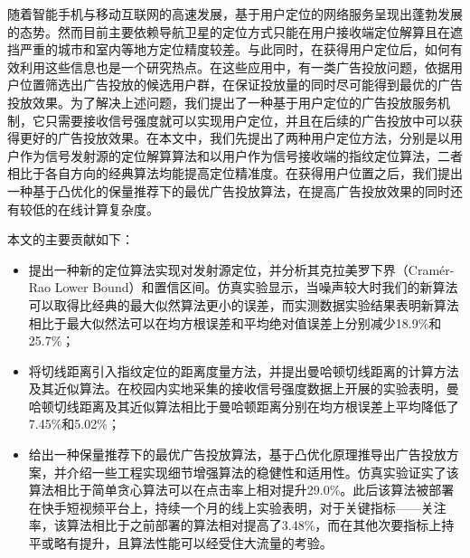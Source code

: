 \begin{cabstract}
  随着智能手机与移动互联网的高速发展，基于用户定位的网络服务呈现出蓬勃发展的态势。然而目前主要依赖导航卫星的定位方式只能在用户接收端定位解算且在遮挡严重的城市和室内等地方定位精度较差。与此同时，在获得用户定位后，如何有效利用这些信息也是一个研究热点。在这些应用中，有一类广告投放问题，依据用户位置筛选出广告投放的候选用户群，在保证投放量的同时尽可能得到最优的广告投放效果。为了解决上述问题，我们提出了一种基于用户定位的广告投放服务机制，它只需要接收信号强度就可以实现用户定位，并且在后续的广告投放中可以获得更好的广告投放效果。在本文中，我们先提出了两种用户定位方法，分别是以用户作为信号发射源的定位解算算法和以用户作为信号接收端的指纹定位算法，二者相比于各自方向的经典算法均能提高定位精准度。在获得用户位置之后，我们提出一种基于凸优化的保量推荐下的最优广告投放算法，在提高广告投放效果的同时还有较低的在线计算复杂度。

  本文的主要贡献如下：
  \begin{itemize}
    \item 提出一种新的定位算法实现对发射源定位，并分析其克拉美罗下界（Cram\'{e}r-Rao Lower Bound）和置信区间。仿真实验显示，当噪声较大时我们的新算法可以取得比经典的最大似然算法更小的误差，而实测数据实验结果表明新算法相比于最大似然法可以在均方根误差和平均绝对值误差上分别减少18.9\%和25.7\%；
    \item 将切线距离引入指纹定位的距离度量方法，并提出曼哈顿切线距离的计算方法及其近似算法。在校园内实地采集的接收信号强度数据上开展的实验表明，曼哈顿切线距离及其近似算法相比于曼哈顿距离分别在均方根误差上平均降低了7.45\%和5.02\%；
    \item 给出一种保量推荐下的最优广告投放算法，基于凸优化原理推导出广告投放方案，并介绍一些工程实现细节增强算法的稳健性和适用性。仿真实验证实了该算法相比于简单贪心算法可以在点击率上相对提升29.0\%。此后该算法被部署在快手短视频平台上，持续一个月的线上实验表明，对于关键指标——关注率，该算法相比于之前部署的算法相对提高了3.48\%，而在其他次要指标上持平或略有提升，且算法性能可以经受住大流量的考验。
  \end{itemize}


\end{cabstract}


